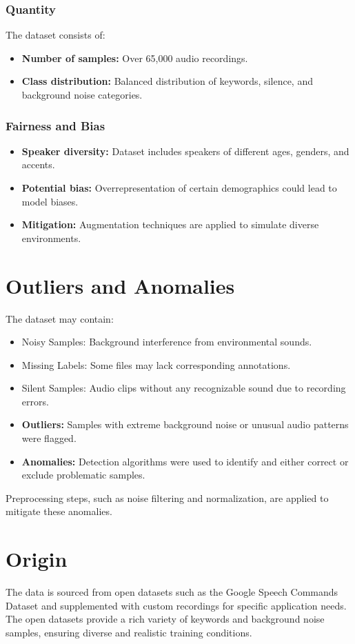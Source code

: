 \subsubsection{Quantity}
The dataset consists of:
\begin{itemize}
	\item \textbf{Number of samples:} Over 65,000 audio recordings.
	\item \textbf{Class distribution:} Balanced distribution of keywords, silence, and background noise categories.
\end{itemize}

\subsubsection{Fairness and Bias}
\begin{itemize}
	\item \textbf{Speaker diversity:} Dataset includes speakers of different ages, genders, and accents.
	\item \textbf{Potential bias:} Overrepresentation of certain demographics could lead to model biases.
	\item \textbf{Mitigation:} Augmentation techniques are applied to simulate diverse environments.
\end{itemize}

\section{Outliers and Anomalies}


The dataset may contain:

\begin{itemize}
	\item Noisy Samples: Background interference from environmental sounds.
	\item Missing Labels: Some files may lack corresponding annotations.
	\item Silent Samples: Audio clips without any recognizable sound due to recording errors.
\end{itemize}

\begin{itemize}
	\item \textbf{Outliers:} Samples with extreme background noise or unusual audio patterns were flagged.
	\item \textbf{Anomalies:} Detection algorithms were used to identify and either correct or exclude problematic samples.
\end{itemize}

Preprocessing steps, such as noise filtering and normalization, are applied to mitigate these anomalies.

\section{Origin}

The data is sourced from open datasets such as the Google Speech Commands Dataset and supplemented with custom recordings for specific application needs. The open datasets provide a rich variety of keywords and background noise samples, ensuring diverse and realistic training conditions.



